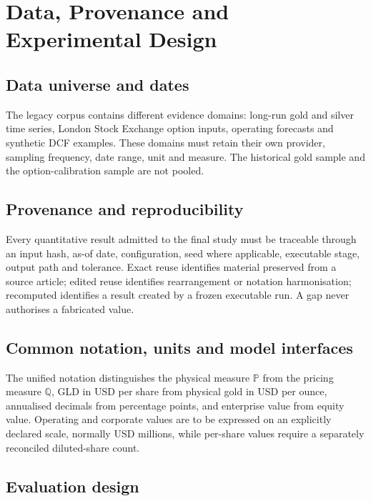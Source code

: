 \section{Data, Provenance and Experimental Design}

\subsection{Data universe and dates}

The legacy corpus contains different evidence domains: long-run gold and silver time series, London Stock Exchange option inputs, operating forecasts and synthetic DCF examples. These domains must retain their own provider, sampling frequency, date range, unit and measure. The historical gold sample and the option-calibration sample are not pooled.

\subsection{Provenance and reproducibility}

Every quantitative result admitted to the final study must be traceable through an input hash, as-of date, configuration, seed where applicable, executable stage, output path and tolerance. Exact reuse identifies material preserved from a source article; edited reuse identifies rearrangement or notation harmonisation; recomputed identifies a result created by a frozen executable run. A gap never authorises a fabricated value.

\subsection{Common notation, units and model interfaces}

The unified notation distinguishes the physical measure $\mathbb P$ from the pricing measure $\mathbb Q$, GLD in USD per share from physical gold in USD per ounce, annualised decimals from percentage points, and enterprise value from equity value. Operating and corporate values are to be expressed on an explicitly declared scale, normally USD millions, while per-share values require a separately reconciled diluted-share count.

\subsection{Evaluation design}

